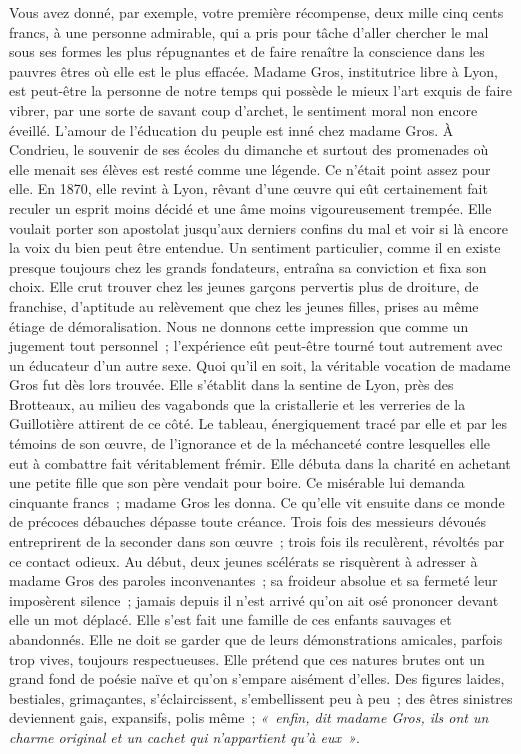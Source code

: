 \documentclass[french,twoside]{book} %
\newcommand\persName[1]{#1}
\newcommand\placeName[1]{#1}
\begin{document}
Vous avez donné, par exemple, votre première récompense, deux mille cinq cents francs, à une personne admirable, qui a pris pour tâche d’aller chercher le mal sous ses formes les plus répugnantes et de faire renaître la conscience dans les pauvres êtres où elle est le plus effacée. {\persName Madame Gros}, institutrice libre à {\placeName Lyon}, est peut-être la personne de notre temps qui possède le mieux l’art exquis de faire vibrer, par une sorte de savant coup d’archet, le sentiment moral non encore éveillé. L’amour de l’éducation du peuple est inné chez {\persName madame Gros}. À {\placeName Condrieu}, le souvenir de ses écoles du dimanche et surtout des promenades où elle menait ses élèves est resté comme une légende. Ce n’était point assez pour elle. En 1870, elle revint à {\placeName Lyon}, rêvant d’une œuvre qui eût certainement fait reculer un esprit moins décidé et une âme moins vigoureusement trempée. Elle voulait porter son apostolat jusqu’aux derniers confins du mal et voir si là encore la voix du bien peut être entendue. Un sentiment particulier, comme il en existe presque toujours chez les grands fondateurs, entraîna sa conviction et fixa son choix. Elle crut trouver chez les jeunes garçons pervertis plus de droiture, de franchise, d’aptitude au relèvement que chez les jeunes filles, prises au même étiage de démoralisation. Nous ne donnons cette impression que comme un jugement tout personnel ; l’expérience eût peut-être tourné tout autrement avec un éducateur d’un autre sexe. Quoi qu’il en soit, la véritable vocation de {\persName madame Gros} fut dès lors trouvée. Elle s’établit dans la sentine de {\placeName Lyon}, près des {\placeName Brotteaux}, au milieu des vagabonds que la cristallerie et les verreries de la {\placeName Guillotière} attirent de ce côté. Le tableau, énergiquement tracé par elle et par les témoins de son œuvre, de l’ignorance et de la méchanceté contre lesquelles elle eut à combattre fait véritablement frémir. Elle débuta dans la charité en achetant une petite fille que son père vendait pour boire. Ce misérable lui demanda cinquante francs ; {\persName madame Gros} les donna. Ce qu’elle vit ensuite dans ce monde de précoces débauches dépasse toute créance. Trois fois des messieurs dévoués entreprirent de la seconder dans son œuvre ; trois fois ils reculèrent, révoltés par ce contact odieux. Au début, deux jeunes scélérats se risquèrent à adresser à {\persName madame Gros} des paroles inconvenantes ; sa froideur absolue et sa fermeté leur imposèrent silence ; jamais depuis il n’est arrivé qu’on ait osé prononcer devant elle un mot déplacé. Elle s’est fait une famille de ces enfants sauvages et abandonnés. Elle ne doit se garder que de leurs démonstrations amicales, parfois trop vives, toujours respectueuses. Elle prétend que ces natures brutes ont un grand fond de poésie naïve et qu’on s’empare aisément d’elles. Des figures laides, bestiales, grimaçantes, s’éclaircissent, s’embellissent peu à peu ; des êtres sinistres deviennent gais, expansifs, polis même ; \emph{« enfin, dit {\persName madame Gros}, ils ont un charme original et un cachet qui n’appartient qu’à eux »}.\par
\end{document}
